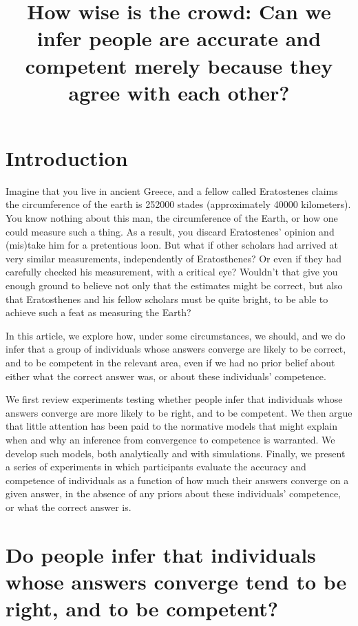 \documentclass[
  doc,floatsintext]{apa6}
\title{How wise is the crowd: Can we infer people are accurate and competent merely because they agree with each other?}
\author{\phantom{0}}
\date{}
\affiliation{\vspace{0.5cm}\textsuperscript{} }
\begin{document}
\maketitle

\section{Introduction}\label{introduction}

Imagine that you live in ancient Greece, and a fellow called Eratostenes claims the circumference of the earth is 252000 stades (approximately 40000 kilometers). You know nothing about this man, the circumference of the Earth, or how one could measure such a thing. As a result, you discard Eratostenes' opinion and (mis)take him for a pretentious loon. But what if other scholars had arrived at very similar measurements, independently of Eratosthenes? Or even if they had carefully checked his measurement, with a critical eye? Wouldn't that give you enough ground to believe not only that the estimates might be correct, but also that Eratosthenes and his fellow scholars must be quite bright, to be able to achieve such a feat as measuring the Earth?

In this article, we explore how, under some circumstances, we should, and we do infer that a group of individuals whose answers converge are likely to be correct, and to be competent in the relevant area, even if we had no prior belief about either what the correct answer was, or about these individuals' competence.

We first review experiments testing whether people infer that individuals whose answers converge are more likely to be right, and to be competent. We then argue that little attention has been paid to the normative models that might explain when and why an inference from convergence to competence is warranted. We develop such models, both analytically and with simulations. Finally, we present a series of experiments in which participants evaluate the accuracy and competence of individuals as a function of how much their answers converge on a given answer, in the absence of any priors about these individuals' competence, or what the correct answer is.

\section{Do people infer that individuals whose answers converge tend to be right, and to be competent?}\label{do-people-infer-that-individuals-whose-answers-converge-tend-to-be-right-and-to-be-competent}
\end{document}
